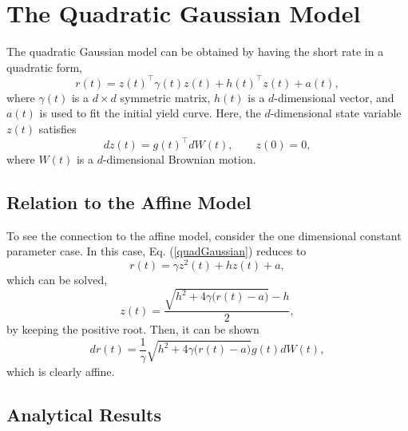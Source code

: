 \documentclass[12pt]{article}
\begin{document}
\section{The Quadratic Gaussian Model}

  The quadratic Gaussian model can be obtained by having the short rate in a quadratic form,
  \begin{equation}
    r(t)=z(t)^{\top}\gamma(t)z(t)+h(t)^{\top}z(t)+a(t),
    \label{quadGaussian}
  \end{equation}
  where $\gamma(t)$ is a $d\times d$ symmetric matrix, $h(t)$ is a $d$-dimensional vector, and $a(t)$ is
  used to fit the initial yield curve. Here, the $d$-dimensional state variable $z(t)$ satisfies
  \begin{equation}
    dz(t)=g(t)^{\top}dW(t), \quad \quad z(0)=0,
  \end{equation}
  where $W(t)$ is a $d$-dimensional Brownian motion.

  \subsection{Relation to the Affine Model}

  To see the connection to the affine model, consider the one dimensional constant parameter case.
  In this case, Eq. (\ref{quadGaussian}) reduces to
  \begin{equation}
    r(t)=\gamma z^2(t)+hz(t)+a,
  \end{equation}
  which can be solved,
  \begin{equation}
    z(t)=\frac{\sqrt{h^2+4\gamma\big(r(t)-a\big)}-h}{2},
  \end{equation}
  by keeping the positive root. Then, it can be shown
  \begin{equation}
    dr(t)=\frac{1}{\gamma}\sqrt{h^2+4\gamma\big(r(t)-a\big)}g(t)dW(t),
  \end{equation}
  which is clearly affine.

  \subsection{Analytical Results}
\end{document}
